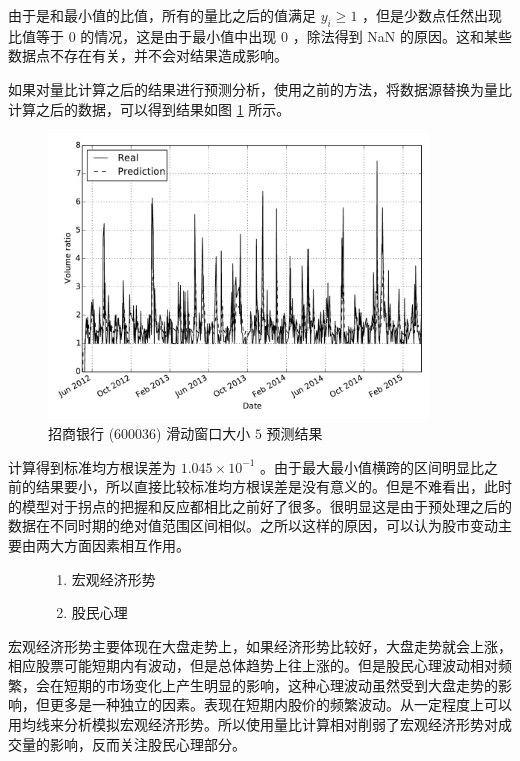 由于是和最小值的比值，所有的量比之后的值满足 $y_{i}\geq 1$ ，但是少数点任然出现比值等于 $0$ 的情况，这是由于最小值中出现 $0$ ，除法得到 NaN 的原因。这和某些数据点不存在有关，并不会对结果造成影响。

如果对量比计算之后的结果进行预测分析，使用之前的方法，将数据源替换为量比计算之后的数据，可以得到结果如图 \ref{sliding_window:1} 所示。

\begin{figure}
  \centering
  \includegraphics[width=0.9\textwidth]{plots/sliding_ratio_forecast.pdf}
  \caption{招商银行 (600036) 滑动窗口大小 $5$ 预测结果}
  \label{sliding_window:1}
\end{figure}

计算得到标准均方根误差为 $1.045\times 10^{-1}$ 。由于最大最小值横跨的区间明显比之前的结果要小，所以直接比较标准均方根误差是没有意义的。但是不难看出，此时的模型对于拐点的把握和反应都相比之前好了很多。很明显这是由于预处理之后的数据在不同时期的绝对值范围区间相似。之所以这样的原因，可以认为股市变动主要由两大方面因素相互作用。

\begin{figure}[H]
  \begin{minipage}{\textwidth}
    \begin{enumerate}
      \item 宏观经济形势
      \item 股民心理
    \end{enumerate}
  \end{minipage}
\end{figure}

宏观经济形势主要体现在大盘走势上，如果经济形势比较好，大盘走势就会上涨，相应股票可能短期内有波动，但是总体趋势上往上涨的。但是股民心理波动相对频繁，会在短期的市场变化上产生明显的影响，这种心理波动虽然受到大盘走势的影响，但更多是一种独立的因素。表现在短期内股价的频繁波动。从一定程度上可以用均线来分析模拟宏观经济形势。所以使用量比计算相对削弱了宏观经济形势对成交量的影响，反而关注股民心理部分。

